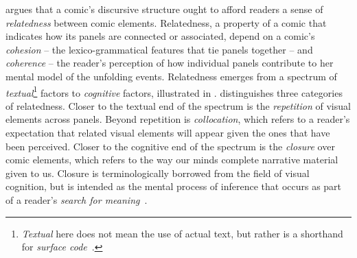\citeauthor{saraceni2016relatedness} argues that a comic's discursive structure
ought to afford readers a sense of \emph{relatedness} between comic elements.
Relatedness, a property of a comic that indicates how its panels are
connected or associated, depend on a comic's \emph{cohesion} -- the
lexico-grammatical features that tie panels together -- and \emph{coherence} --
the reader's perception of how individual panels contribute to her mental model
of the unfolding events. Relatedness emerges from a spectrum of \emph{textual}\footnote{\emph{Textual} here does not mean the use of actual text, but rather is a shorthand for \emph{surface code}~\cite{zwaan1998situation}.}
factors to \emph{cognitive} factors, illustrated in .
%
%
\citeauthor{saraceni2016relatedness} distinguishes three categories of relatedness.
Closer to the textual end of the spectrum is the \emph{repetition} of visual
elements across panels. Beyond repetition is \emph{collocation}, which refers
to a reader's expectation that related visual elements will appear given the
ones that have been perceived. Closer to the cognitive end of the spectrum is
the \emph{closure} over comic elements, which refers to the way our minds 
complete narrative material given to us. Closure is terminologically borrowed 
from the field of visual cognition, but is intended as the mental process 
of inference that occurs as part of a reader's 
\emph{search for meaning}~\cite{gerrig1994readers}.


